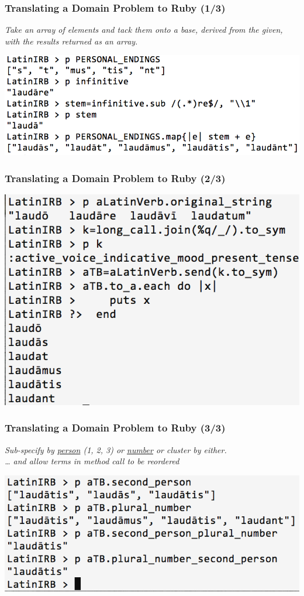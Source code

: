 \documentclass[slidestop,compress,mathserif]{beamer}
\begin{document}
\begin{frame}
	\frametitle{Translating a Domain Problem to Ruby (1/3)} 
	\emph{Take an array of elements and tack them onto a base, derived from the
    given, with the results returned as an array.
}	\begin{center}
		\includegraphics[scale=0.38]{img/conj_how.png}	
	\end{center}
\end{frame}

\begin{frame}
	\frametitle{Translating a Domain Problem to Ruby (2/3)} 
	\includegraphics[scale=0.39]{img/conj_how_3b.png}	
\end{frame}


\begin{frame}
	\frametitle{Translating a Domain Problem to Ruby (3/3)} 
	\emph{
		Sub-specify by \underline{person} (1, 2, 3) or \underline{number} or
    cluster by either. \\
		\pause
		{\ldots} and allow terms in method call to be reordered
  }
	\vskip 0.5cm
	\begin{center}
		\includegraphics[scale=0.38]{img/conj_subspec.png}	
	\end{center}
\end{frame}
\end{document}
